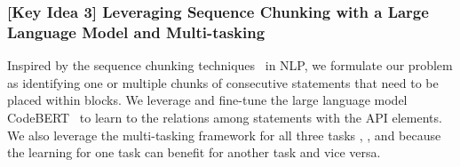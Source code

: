 

\subsubsection{{\bf [Key Idea 3] Leveraging Sequence Chunking with a Large Language Model and Multi-tasking}} 
Inspired by the sequence chunking
techniques~\cite{sequence-chunking-aaai17} in NLP, we formulate our
problem as identifying one or multiple chunks of consecutive
statements that need to be placed within  blocks. We
leverage and fine-tune the large language model
CodeBERT~\cite{codebert-emnlp20} to learn to the relations among
statements with the API elements.  We also leverage the multi-tasking
framework for all three tasks {\xblock}, {\xstate}, and {\xtype}
because the learning for one task can benefit for another task and
vice versa.

